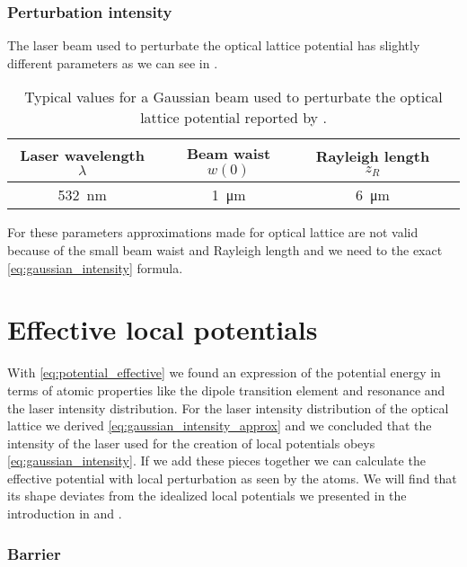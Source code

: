 \subsubsection{Perturbation intensity}

The laser beam used to perturbate the optical lattice potential has slightly
different parameters \cite{Hertlein2017} as we can see in
.
\begin{table}[h]
  \centering
  \begin{tabular}{|c|c|c|c|}
    \hline
    Laser wavelength $\lambda$ &
    Beam waist $w(0)$ &
    Rayleigh length $z_R$ \\
    \hline
    \SI{532}{\nano\meter} &
    \SI{1}{\micro\meter} &
    \SI{6}{\micro\meter} \\
    \hline
  \end{tabular}
  \captionsetup{width=.8\textwidth}
  \caption{Typical values for a Gaussian beam used to perturbate the optical
    lattice potential reported by \cite{Hertlein2017}.}
  \label{tab:gaussian_beam_perturbation}
\end{table}
For these parameters approximations made for optical lattice are not valid
because of the small beam waist and Rayleigh length and we need to the exact
\cref{eq:gaussian_intensity} formula.

\section{Effective local potentials}

With \cref{eq:potential_effective} we found an expression of the potential
energy in terms of atomic properties like the dipole transition element and
resonance and the laser intensity distribution. For the laser intensity
distribution of the optical lattice we derived
\cref{eq:gaussian_intensity_approx} and we concluded that the intensity of the
laser used for the creation of local potentials obeys
\cref{eq:gaussian_intensity}. If we add these pieces together we can calculate
the effective potential with local perturbation as seen by the atoms. We will
find that its shape deviates from the idealized local potentials we presented
in the introduction in  and 
.

\subsubsection{Barrier}


